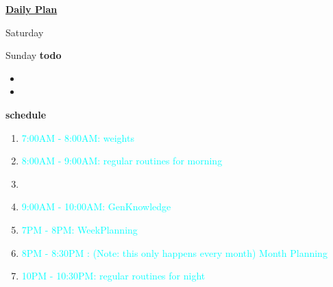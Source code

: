 \documentclass[serif,mathserif,final]{beamer}
\newcommand{\regItem}[1]{\item \textcolor{cyan}{#1}}
\begin{document}
\begin{frame}{}
\begin{columns}[t]
\begin{column}{0.33\linewidth}{\textbf{\underline{Daily Plan}}}
{\begin{block}{\small Saturday }
\end{block} 

\begin{block}{\small Sunday } 
  \textbf{todo} 
  \begin{itemize} 
  \item \tiny 
  \item \tiny
  \end{itemize} 

  \textbf{schedule} 
  \begin{enumerate} 
    \regItem{7:00AM - 8:00AM: weights}
    \regItem{8:00AM - 9:00AM: regular routines for morning}
  \item \tiny    
    \regItem{9:00AM - 10:00AM: GenKnowledge} 

    \regItem{7PM - 8PM: WeekPlanning} 
    \regItem{8PM - 8:30PM : (Note: this only happens every month) Month Planning} 
    
    \regItem{10PM  - 10:30PM: regular routines for night}
  \end{enumerate} 
  
\end{block} 

} %



\end{column}
\end{columns}
\end{frame}
\end{document}
